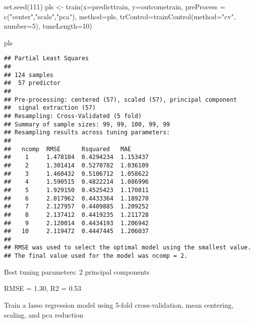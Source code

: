 \documentclass[
]{article}
\newenvironment{Shaded}{\begin{snugshade}}{\end{snugshade}}
\newcommand{\AttributeTok}[1]{\textcolor[rgb]{0.77,0.63,0.00}{#1}}
\newcommand{\DecValTok}[1]{\textcolor[rgb]{0.00,0.00,0.81}{#1}}
\newcommand{\FunctionTok}[1]{\textcolor[rgb]{0.00,0.00,0.00}{#1}}
\newcommand{\NormalTok}[1]{#1}
\newcommand{\OtherTok}[1]{\textcolor[rgb]{0.56,0.35,0.01}{#1}}
\newcommand{\StringTok}[1]{\textcolor[rgb]{0.31,0.60,0.02}{#1}}
\begin{document}
\begin{Shaded}
\begin{Highlighting}[]
\FunctionTok{set.seed}\NormalTok{(}\DecValTok{111}\NormalTok{)}
\NormalTok{pls }\OtherTok{\textless{}{-}} \FunctionTok{train}\NormalTok{(}\AttributeTok{x=}\NormalTok{predicttrain,}
             \AttributeTok{y=}\NormalTok{outcometrain,}
             \AttributeTok{preProcess =} \FunctionTok{c}\NormalTok{(}\StringTok{"center"}\NormalTok{,}\StringTok{"scale"}\NormalTok{,}\StringTok{"pca"}\NormalTok{),}
             \AttributeTok{method=}\StringTok{\textquotesingle{}pls\textquotesingle{}}\NormalTok{,}
             \AttributeTok{trControl=}\FunctionTok{trainControl}\NormalTok{(}\AttributeTok{method=}\StringTok{"cv"}\NormalTok{, }\AttributeTok{number=}\DecValTok{5}\NormalTok{),}
             \AttributeTok{tuneLength=}\DecValTok{10}\NormalTok{)}

\NormalTok{pls}
\end{Highlighting}
\end{Shaded}

\begin{verbatim}
## Partial Least Squares 
## 
## 124 samples
##  57 predictor
## 
## Pre-processing: centered (57), scaled (57), principal component
##  signal extraction (57) 
## Resampling: Cross-Validated (5 fold) 
## Summary of sample sizes: 99, 99, 100, 99, 99 
## Resampling results across tuning parameters:
## 
##   ncomp  RMSE      Rsquared   MAE     
##    1     1.478104  0.4294234  1.153437
##    2     1.301414  0.5270782  1.036109
##    3     1.460432  0.5106712  1.058622
##    4     1.590515  0.4822214  1.086996
##    5     1.929150  0.4525423  1.170811
##    6     2.017962  0.4433364  1.189270
##    7     2.127957  0.4409885  1.209252
##    8     2.137412  0.4419235  1.211728
##    9     2.120014  0.4434193  1.206942
##   10     2.119472  0.4447445  1.206037
## 
## RMSE was used to select the optimal model using the smallest value.
## The final value used for the model was ncomp = 2.
\end{verbatim}

Best tuning parameters: 2 principal components

RMSE = 1.30, R2 = 0.53

Train a lasso regression model using 5-fold cross-validation, mean
centering, scaling, and pca reduction
\end{document}
